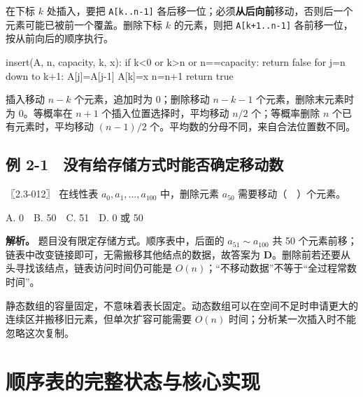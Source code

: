 在下标 \(k\) 处插入，要把 \texttt{A[\allowbreak{}k.\allowbreak{}.\allowbreak{}n-1]\allowbreak{}} 各后移一位；必须\textbf{从后向前}移动，否则后一个元素可能已被前一个覆盖。删除下标 \(k\) 的元素，则把 \texttt{A[\allowbreak{}k+\allowbreak{}1.\allowbreak{}.\allowbreak{}n-1]\allowbreak{}} 各前移一位，按从前向后的顺序执行。

\par\medskip\noindent\begin{minipage}{\linewidth}
\begin{codeblock}[language={}]
insert(A, n, capacity, k, x):
    if k<0 or k>n or n==capacity: return false
    for j=n down to k+1: A[j]=A[j-1]
    A[k]=x
    n=n+1
    return true
\end{codeblock}
\end{minipage}\par\medskip

插入移动 \(n-k\) 个元素，追加时为 0；删除移动 \(n-k-1\) 个元素，删除末元素时为 0。等概率在 \(n+1\) 个插入位置选择时，平均移动 \(n/2\) 个；等概率删除 \(n\) 个已有元素时，平均移动 \((n-1)/2\) 个。平均数的分母不同，来自合法位置数不同。

\subsection{例 2-1　没有给存储方式时能否确定移动数}\label{DS02-ex1}

\begin{example}[配套例题]

〖2.3-012〗 在线性表 \(a_0,a_1,\ldots,a_{100}\) 中，删除元素 \(a_{50}\) 需要移动（　）个元素。

A. 0　B. 50　C. 51　D. 0 或 50

\end{example}

\textbf{解析。} 题目没有限定存储方式。顺序表中，后面的 \(a_{51}\sim a_{100}\) 共 50 个元素前移；链表中改变链接即可，无需搬移其他结点的数据，故答案为 \textbf{D}。删除前若还要从头寻找该结点，链表访问时间仍可能是 \(O(n)\)；``不移动数据''不等于``全过程常数时间''。

静态数组的容量固定，不意味着表长固定。动态数组可以在空间不足时申请更大的连续区并搬移旧元素，但单次扩容可能需要 \(O(n)\) 时间；分析某一次插入时不能忽略这次复制。

\section{顺序表的完整状态与核心实现}\label{DS02-code-seq}


